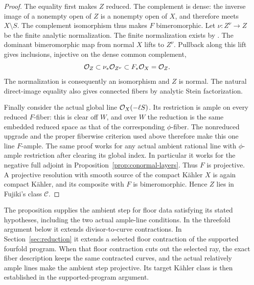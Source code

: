 \begin{proof}
The equality first makes \(Z\) reduced.  The complement is dense:
the inverse image of a nonempty open of \(Z\) is a nonempty open of
\(X\), and therefore meets \(X\setminus S\).  The complement
isomorphism thus makes \(F\) bimeromorphic.  Let
\(\nu:Z^\nu\to Z\) be the finite analytic normalization.  The
finite normalization exists by
\cite[Part~B, Section~4, Corollaries~2--3]{Houzel1961}.  The
dominant bimeromorphic map from normal \(X\) lifts to \(Z^\nu\).
Pullback along this lift gives inclusions, injective on the dense common
complement,
\[
 \mathcal O_Z\subset\nu_*\mathcal O_{Z^\nu}\subset F_*\mathcal O_X=\mathcal O_Z.
\]
The normalization is consequently an isomorphism and \(Z\) is normal.
The natural direct-image equality also gives connected fibers by analytic
Stein factorization.

Finally consider the actual global line \(\mathcal O_X(-\ell S)\).  Its
restriction is ample on every reduced \(F\)-fiber: this is clear off
\(W\), and over \(W\) the reduction is the same embedded reduced
space as that of the corresponding \(\phi\)-fiber.  The nonreduced
upgrade and the proper fiberwise criterion used above therefore make
this one line \(F\)-ample.  The same proof works for any actual ambient
rational line with \(\phi\)-ample restriction after clearing its
global index.  In particular it works for the negative full adjoint
in Proposition~\ref{prop:conormal-layers}.  Thus \(F\) is projective.
A projective resolution with smooth source of the compact K\"ahler
\(X\) is again compact K\"ahler, and its composite with \(F\) is
bimeromorphic.  Hence \(Z\) lies in Fujiki's class \(\mathcal C\).
\end{proof}

The proposition supplies the ambient step for floor data satisfying its
stated hypotheses, including the two actual ample-line conditions.  In
the threefold argument below it extends divisor-to-curve contractions.  In
Section~\ref{sec:reduction} it extends a selected floor contraction of
the supported fourfold program.  When that floor contraction cuts out
the selected ray, the exact fiber description keeps the same contracted
curves, and the actual relatively ample lines make the ambient step
projective.  Its target K\"ahler class is then established in the
supported-program argument.

